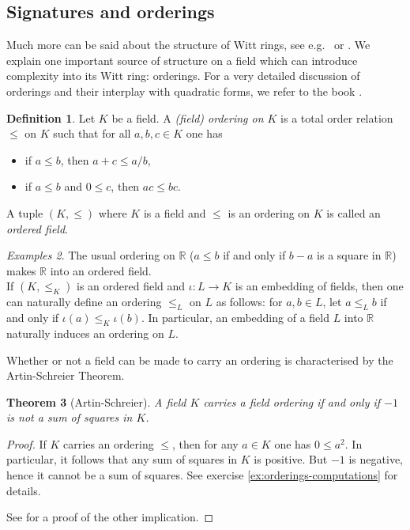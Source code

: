 \documentclass[12pt, leqno, british]{amsart}
\theoremstyle{definition}
\newtheorem{defi}{Definition}[subsection]
\theoremstyle{plain}
\newtheorem{thm}[defi]{Theorem}
\theoremstyle{remark}
\newtheorem{egs}[defi]{Examples}
\newcommand{\rr}{\mathbb R}
\begin{document}
\subsection{Signatures and orderings}
Much more can be said about the structure of Witt rings, see e.g.~\autocite[Chapter V]{ElmanKarpenkoMerkurjev} or \autocite[Sections VIII.7 and VIII.8]{Lam}.
We explain one important source of structure on a field which can introduce complexity into its Witt ring: orderings.
For a very detailed discussion of orderings and their interplay with quadratic forms, we refer to the book \autocite{OrderingsLam}.
\begin{defi}
Let $K$ be a field.
A \emph{(field) ordering on $K$} is a total order relation $\leq$ on $K$ such that for all $a, b, c \in K$ one has
\begin{itemize}
\item if $a \leq b$, then $a + c \leq a / b$,
\item if $a \leq b$ and $0 \leq c$, then $ac \leq bc$.
\end{itemize}
A tuple $(K, \leq)$ where $K$ is a field and $\leq$ is an ordering on $K$ is called an \emph{ordered field}.
\end{defi}
\begin{egs}
The usual ordering on $\rr$ ($a \leq b$ if and only if $b-a$ is a square in $\rr$) makes $\rr$ into an ordered field. \\
If $(K, \leq_K)$ is an ordered field and $\iota : L \to K$ is an embedding of fields, then one can naturally define an ordering $\leq_L$ on $L$ as follows: for $a, b \in L$, let $a \leq_L b$ if and only if $\iota(a) \leq_K \iota(b)$.
In particular, an embedding of a field $L$ into $\rr$ naturally induces an ordering on $L$.
\end{egs}
Whether or not a field can be made to carry an ordering is characterised by the Artin-Schreier Theorem.
\begin{thm}[Artin-Schreier]\label{T:Artin-Schreier}
A field $K$ carries a field ordering if and only if $-1$ is not a sum of squares in $K$.
\end{thm}
\begin{proof}
If $K$ carries an ordering $\leq$, then for any $a \in K$ one has $0 \leq a^2$.
In particular, it follows that any sum of squares in $K$ is positive.
But $-1$ is negative, hence it cannot be a sum of squares.
See exercise \eqref{ex:orderings-computations} for details.

See \autocite[]{OrderingsLam} for a proof of the other implication.
\end{proof}
\end{document}
